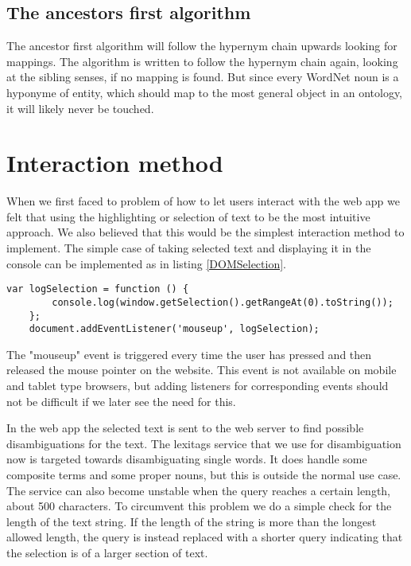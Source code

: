 \subsection{The ancestors first algorithm}
The ancestor first algorithm will follow the hypernym chain upwards looking for mappings.
The algorithm is written to follow the hypernym chain again, looking at the sibling senses, if no mapping is found.
But since every WordNet noun is a hyponyme of {entity}, which should map to the most general object in an ontology,
it will likely never be touched.



\section{Interaction method}
\label{Interaction}
When we first faced to problem of how to let users interact with the web app we felt that using the highlighting or
selection of text to be the most intuitive approach.
We also believed that this would be the simplest interaction method to implement.
The simple case of taking selected text and displaying it in the console can be implemented as in listing \ref{DOMSelection}.

\begin{lstlisting}[caption={Logging selected text}, label=DOMSelection]
	var logSelection = function () {
		console.log(window.getSelection().getRangeAt(0).toString());
	};
	document.addEventListener('mouseup', logSelection);
\end{lstlisting}

The "mouseup" event is triggered every time the user has pressed and then released the mouse pointer on the website.
This event is not available on mobile and tablet type browsers,
but adding listeners for corresponding events should not be difficult if we later see the need for this.

In the web app the selected text is sent to the web server to find possible disambiguations for the text.
The lexitags service that we use for disambiguation now is targeted towards disambiguating single words.
It does handle some composite terms and some proper nouns, but this is outside the normal use case.
The service can also become unstable when the query reaches a certain length, about 500 characters.
To circumvent this problem we do a simple check for the length of the text string.
If the length of the string is more than the longest allowed length,
the query is instead replaced with a shorter query indicating that the selection is of a larger section of text.


